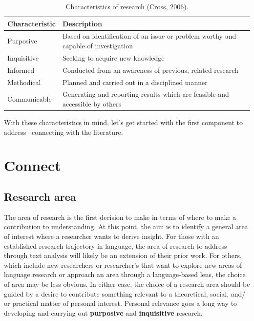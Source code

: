 \documentclass[
  letterpaper,
]{latex/krantz}
\begin{document}
\hypertarget{tbl-fr-cross-research-char-table}{}
\begin{table}
\caption{\label{tbl-fr-cross-research-char-table}Characteristics of research (Cross, 2006). }\tabularnewline

\centering
\begin{tabular}{ll}
\toprule
Characteristic & Description\\
\midrule
Purposive & Based on identification of an issue or problem worthy and capable of investigation\\
Inquisitive & Seeking to acquire new knowledge\\
Informed & Conducted from an awareness of previous, related research\\
Methodical & Planned and carried out in a disciplined manner\\
Communicable & Generating and reporting results which are feasible and accessible by others\\
\bottomrule
\end{tabular}
\end{table}

With these characteristics in mind, let's get started with the first
component to address --connecting with the literature.

\hypertarget{fr-connect}{%
\section{Connect}\label{fr-connect}}

\hypertarget{research-area}{%
\subsection{Research area}\label{research-area}}

The area of research is the first decision to make in terms of where to
make a contribution to understanding. At this point, the aim is to
identify a general area of interest where a researcher wants to derive
insight. For those with an established research trajectory in language,
the area of research to address through text analysis will likely be an
extension of their prior work. For others, which include new researchers
or researcher's that want to explore new areas of language research or
approach an area through a language-based lens, the choice of area may
be less obvious. In either case, the choice of a research area should be
guided by a desire to contribute something relevant to a theoretical,
social, and/ or practical matter of personal interest. Personal
relevance goes a long way to developing and carrying out
\textbf{purposive} and \textbf{inquisitive} research.
\end{document}
